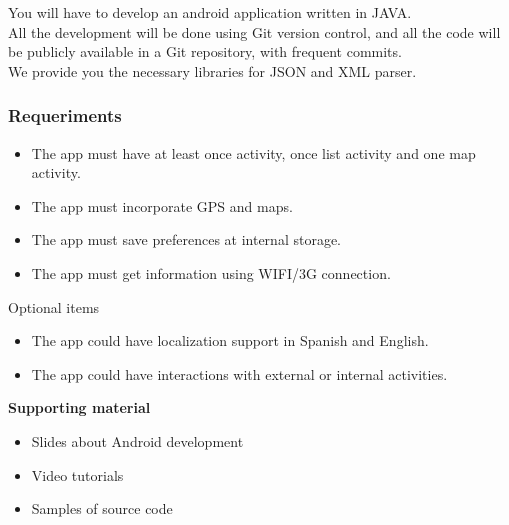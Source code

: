\documentclass[a4paper]{article}
\begin{document}
You will have to develop an android application written in JAVA.
\\
All the development will be done using Git version control, and all
the code will be publicly available in a Git repository, with frequent
commits.
\\
We provide you the necessary libraries for JSON and XML parser.
\\
\subsubsection{Requeriments}

\begin{itemize}
\item The app must have at least once activity, once list activity and one map activity.
\item The app must incorporate GPS and maps.
\item The app must save preferences at internal storage.
\item The app must get information using WIFI/3G connection.
\end{itemize}

Optional items
\begin{itemize}
\item The app could have localization support in Spanish and English.
\item The app could have interactions with external or internal activities.
\end{itemize}

\vspace{0.4cm}

\textbf{Supporting material}

\begin{itemize}
\item Slides about Android development
\item Video tutorials
\item Samples of source code
\end{itemize}


\end{document}
